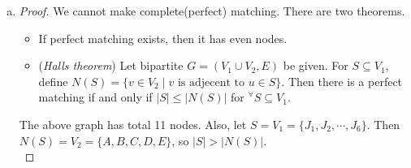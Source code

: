 \begin{enumerate} [(a)]
\begin{proof} [Solution]
\begin{center}
		\end{center}
	\end{proof}
	\item \begin{proof}
		We cannot make complete(perfect) matching. There are two theorems.
		\begin{itemize}
			\item If perfect matching exists, then it has even nodes.
			\item (\textit{Hall\textquotesingle s theorem}) Let bipartite $G = (V_1\cup V_2, E)$ be given. For $S\subseteq V_1$, define $N(S) = \{v \in V_2\mid v\mbox{ is adjecent to }u\in S\}$. Then there is a perfect matching if and only if $\left|S\right| \leq \left|N(S)\right|$ for $^\forall S\subseteq V_1$.
		\end{itemize}
		The above graph has total 11 nodes. Also, let $S = V_1 = \{J_1, J_2, \cdots, J_6\}$. Then $N(S) = V_2 = \{A, B, C, D, E\}$, so $\left|S\right| > \left|N(S)\right|$.\\
	\end{proof}
\end{enumerate}